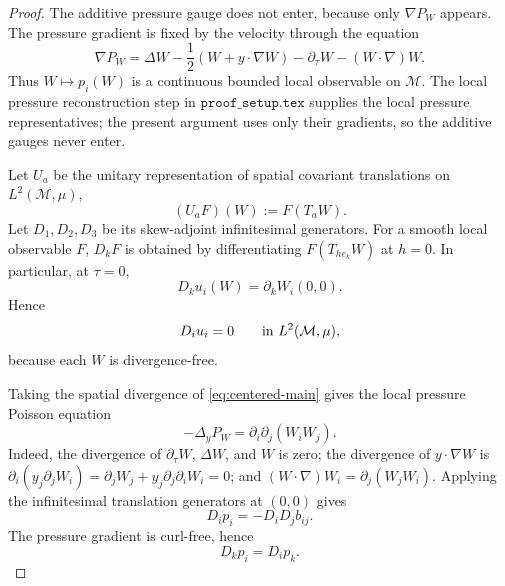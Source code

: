 \documentclass[11pt]{amsart}
\numberwithin{equation}{section}
\theoremstyle{plain}
\theoremstyle{definition}
\theoremstyle{remark}
\newcommand{\calM}{\mathcal M}
\begin{document}
\begin{proof}
The additive pressure gauge does not enter, because only \(\nabla P_W\) appears.
The pressure gradient is fixed by the velocity through the equation
\[
   \nabla P_W
   =
   \Delta W-\frac12(W+y\cdot\nabla W)
   -\partial_\tau W-(W\cdot\nabla)W .
\]
Thus \(W\mapsto p_i(W)\) is a continuous bounded local observable on
\(\calM\).  The local pressure reconstruction step in
\(\texttt{proof\_setup.tex}\) supplies the local pressure representatives; the present
argument uses only their gradients, so the additive gauges never enter.

Let \(U_a\) be the unitary representation of spatial covariant translations
on \(L^2(\calM,\mu)\),
\[
   (U_aF)(W):=F(T_aW).
\]
Let \(D_1,D_2,D_3\) be its skew-adjoint infinitesimal generators.  For a smooth
local observable \(F\), \(D_kF\) is obtained by differentiating
\(F(T_{he_k}W)\) at \(h=0\).  In particular, at \(\tau=0\),
\[
   D_k u_i(W)=\partial_kW_i(0,0).
\]
Hence
\begin{equation}\label{eq:state-div-free}
   D_i u_i=0
   \qquad\hbox{in }L^2(\calM,\mu),
\end{equation}
because each \(W\) is divergence-free.

Taking the spatial divergence of \eqref{eq:centered-main} gives the local
pressure Poisson equation
\begin{equation}\label{eq:local-pressure-poisson-core}
   -\Delta_yP_W=\partial_i\partial_j(W_iW_j).
\end{equation}
Indeed, the divergence of \(\partial_\tau W\), \(\Delta W\), and \(W\) is
zero; the divergence of \(y\cdot\nabla W\) is
\(\partial_i(y_j\partial_jW_i)=\partial_jW_j+y_j\partial_j\partial_iW_i=0\);
and \((W\cdot\nabla)W_i=\partial_j(W_jW_i)\).  Applying the infinitesimal
translation generators at \((0,0)\) gives
\begin{equation}\label{eq:state-pressure-divergence}
   D_i p_i=-D_iD_jb_{ij}.
\end{equation}
The pressure gradient is curl-free, hence
\begin{equation}\label{eq:state-pressure-curl}
   D_kp_i=D_ip_k .
\end{equation}


\end{proof}
\end{document}
